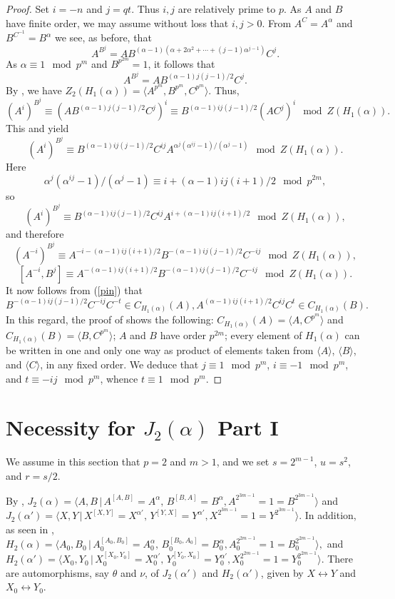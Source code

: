 \documentclass{amsart}
\theoremstyle{definition}
\theoremstyle{remark}
\begin{document}
\begin{proof}
Set $i=-n$ and $j=qt$. Thus $i,j$ are relatively prime to $p$. As $A$ and $B$ have finite order, we may assume without loss that $i,j>0$.
From $A^C=A^\alpha$ and $B^{C^{-1}}=B^\alpha$ we see, as before, that
$$
A^{B^j}=A B^{(\alpha-1)(\alpha+2\alpha^2+\cdots+(j-1)\alpha^{j-1})} C^j.
$$
As $\alpha\equiv 1\mod p^m$ and $B^{p^{2m}}=1$, it follows that
$$
A^{B^j}=A B^{(\alpha-1)j(j-1)/2}C^j.
$$
By \cite[Theorem 8.1]{MS}, we have $Z_2(H_1(\alpha))=\langle A^{p^m},  B^{p^m}, C^{p^m}\rangle$. Thus,
$$
(A^i)^{B^j}\equiv (A B^{(\alpha-1)j(j-1)/2} C^j)^i\equiv B^{(\alpha-1)ij(j-1)/2} (A C^j)^i\mod Z(H_1(\alpha)).
$$
This and \cite[Eq. (1.3)]{M} yield
$$
(A^i)^{B^j}\equiv B^{(\alpha-1)ij(j-1)/2} C^{ij} A^{\alpha^{j}(\alpha^{ij}-1)/(\alpha^{j}-1)}\mod Z(H_1(\alpha)).
$$
Here
$$
\alpha^{j}(\alpha^{ij}-1)/(\alpha^{j}-1)\equiv i+(\alpha-1)ij (i+1)/2\mod p^{2m},
$$
so
$$
(A^i)^{B^j}\equiv B^{(\alpha-1)ij(j-1)/2} C^{ij} A^{i+(\alpha-1)ij (i+1)/2}\mod Z(H_1(\alpha)),
$$
and therefore
$$
(A^{-i})^{B^j}\equiv A^{-i-(\alpha-1)ij (i+1)/2} B^{-(\alpha-1)ij(j-1)/2} C^{-ij}\mod Z(H_1(\alpha)),
$$
$$
[A^{-i},B^j]\equiv A^{-(\alpha-1)ij (i+1)/2} B^{-(\alpha-1)ij(j-1)/2} C^{-ij}\mod Z(H_1(\alpha)).
$$
It now follows from (\ref{pin}) that
$$
B^{-(\alpha-1)ij(j-1)/2} C^{-ij}C^{-t}\in C_{H_1(\alpha)}(A),
A^{(\alpha-1)ij(i+1)/2} C^{ij} C^{t}\in C_{H_1(\alpha)}(B).
$$
In this regard, the proof of \cite[Theorem 8.1]{MS} shows the following:
$C_{H_1(\alpha)}(A)=\langle A, C^{p^m}\rangle$ and $C_{H_1(\alpha)}(B)=\langle B, C^{p^m}\rangle$;
$A$ and $B$ have order $p^{2m}$; every element of $H_1(\alpha)$ can be written in one and only one way
as product of elements taken from $\langle A\rangle$, $\langle B\rangle$, and $\langle C\rangle$,
in any fixed order. We deduce that $j\equiv 1\mod p^m$, $i\equiv -1\mod p^m$,
and $t\equiv -ij\mod p^{m}$, whence $t\equiv 1\mod p^{m}$.
\end{proof}


\section{Necessity for $J_2(\alpha)$ Part I}\label{part1}

We assume in this section that $p=2$ and $m>1$, and we set $s=2^{m-1}$, $u=s^2$, and $r=s/2$.

By \cite[Section 2]{MS3},
$
J_2(\alpha)=\langle A,B\,|\, A^{[A,B]}=A^{\alpha},\, B^{[B,A]}=B^{\alpha},  A^{2^{3m-1}}=1=B^{2^{3m-1}}\rangle
$
and
$
J_2(\alpha')=\langle X,Y\,|\, X^{[X,Y]}=X^{\alpha'},\, Y^{[Y,X]}=Y^{\alpha'},  X^{2^{3m-1}}=1=Y^{2^{3m-1}}\rangle.
$
In addition, as seen in \cite[Section 6]{MS3},
$
H_2(\alpha)=\langle A_0,B_0\,|\, A_0^{[A_0,B_0]}=A_0^\alpha,\, B_0^{[B_0,A_0]}=B_0^\alpha, A_0^{2^{2m-1}}=1=B_0^{2^{2m-1}}\rangle,
$
and
$
H_2(\alpha')=\langle X_0,Y_0\,|\, X_0^{[X_0,Y_0]}=X_0^{\alpha'},\, Y_0^{[Y_0,X_0]}=Y_0^{\alpha'},  X_0^{2^{2m-1}}=1=Y_0^{2^{2m-1}}\rangle.
$
There are automorphisms, say $\theta$ and $\nu$, of $J_2(\alpha')$ and $H_2(\alpha')$, given by $X\leftrightarrow Y$
and $X_0\leftrightarrow Y_0$.
\end{document}
